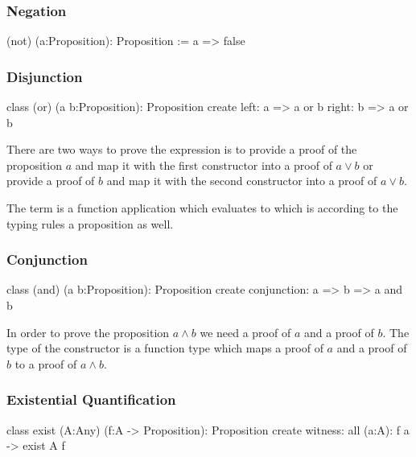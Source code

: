 \subsubsection{Negation}
%
\begin{alba}
  (not) (a:Proposition): Proposition
    := a => false
\end{alba}
\vskip 2mm


\subsubsection{Disjunction}
%
\begin{alba}
  class
    (or) (a b:Proposition): Proposition
  create
    left:  a => a or b
    right: b => a or b
\end{alba}

There are two ways to prove the expression  is to provide a proof
of the proposition $a$ and map it with the first constructor into a proof of
$a \lor b$ or provide a proof of $b$ and map it with the second constructor
into a proof of $a \lor b$.

The term  is a function application which evaluates to
 which is according to the typing rules a proposition
as well.
\newline


\subsubsection{Conjunction}
%
\begin{alba}
  class
    (and) (a b:Proposition): Proposition
  create
    conjunction: a => b => a and b
\end{alba}

In order to prove the proposition $a \land b$ we need a proof of $a$ and a
proof of $b$. The type of the constructor is a function type which maps a
proof of $a$ and a proof of $b$ to a proof of $a \land b$.
\newline


\subsubsection{Existential Quantification}

\begin{alba}
  class
     exist (A:Any) (f:A -> Proposition): Proposition
  create
     witness: all (a:A): f a -> exist A f
\end{alba}

